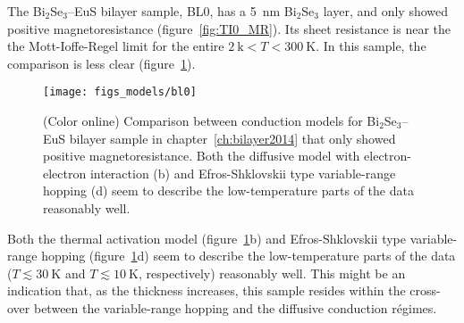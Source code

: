 The Bi$_2$Se$_3$--EuS bilayer sample, BL0, has a \SI{5}{nm} Bi$_2$Se$_3$ layer, and only showed positive magnetoresistance (figure~\ref{fig:TI0_MR}). Its sheet resistance is near the the Mott-Ioffe-Regel limit for the entire $2~\mathrm{k} < T < 300~\mathrm{K}$. In this sample, the comparison is less clear (figure~\ref{fig:models_bl0}).%
\begin{figure}[ht]%
    \centering%
    \texttt{[image: figs\_models/bl0]}%
    \caption[Conduction model comparison: Bi$_2$Se$_3$--EuS bilayer: BL0]{\label{fig:models_bl0}(Color online) Comparison between conduction models for Bi$_2$Se$_3$--EuS bilayer sample in chapter~\ref{ch:bilayer2014} that only showed positive magnetoresistance. Both the diffusive model with electron-electron interaction (b) and Efros-Shklovskii type variable-range hopping (d) seem to describe the low-temperature parts of the data reasonably well.}%
\end{figure} %
%
Both the thermal activation model (figure~\ref{fig:models_bl0}b) and Efros-Shklovskii type variable-range hopping (figure~\ref{fig:models_bl0}d) seem to describe the low-temperature parts of the data ($T \lesssim 30~\mathrm{K}$ and $T \lesssim 10~\mathrm{K}$, respectively) reasonably well. This might be an indication that, as the thickness increases, this sample resides within the cross-over between the variable-range hopping and the diffusive conduction r\'egimes.

